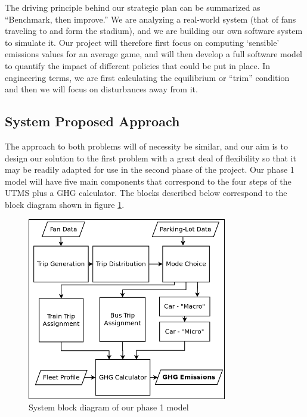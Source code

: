 The driving principle behind our strategic plan can be summarized as
``Benchmark, then improve.'' We are analyzing a real-world system
(that of fans traveling to and form the stadium), and we are building
our own software system to simulate it. Our project will therefore
first focus on computing `sensible' emissions values for an average
game, and will then develop a full software model to quantify the
impact of different policies that could be put in place. In
engineering terms, we are first calculating the equilibrium or
``trim'' condition and then we will focus on disturbances away from
it.

\subsection{System Proposed Approach}
The approach to both problems will of necessity be similar, and our
aim is to design our solution to the first problem with a great deal
of flexibility so that it may be readily adapted for use in the second
phase of the project. Our phase 1 model will have five main components
that correspond to the four steps of the UTMS plus a GHG
calculator. The blocks described below correspond to the block diagram
shown in figure \ref{mainsystem1}.

\begin{figure}[htp]
  \centering
  \includegraphics[height=8cm]{graphics/fullsystem1.png}
  \caption{System block diagram of our phase 1 model}
  \label{mainsystem1}
\end{figure}

